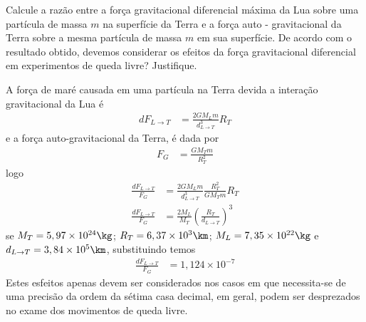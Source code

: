 \begin{prob}
	Calcule a razão entre a força gravitacional diferencial máxima da Lua sobre uma partícula
	de massa $m$ na superfície da Terra e a força auto - gravitacional da Terra sobre a mesma partícula de massa $m$ em sua superfície. De acordo com o resultado obtido, devemos considerar os efeitos da força gravitacional diferencial em experimentos de queda livre? Justifique.
	\begin{sol}
		A força de maré causada em uma partícula na Terra devida a interação gravitacional da Lua é
		\begin{align}
			dF_{L\to T}&=\frac{2GM_Lm}{d^3_{L\to T}}R_T
		\end{align}
		e a força auto-gravitacional da Terra, é dada por
		\begin{align}
			F_G&=\frac{GM_Tm}{R_T^2}
		\end{align}
		logo
		\begin{align}
			\frac{dF_{L\to T}}{F_G}&=\frac{2GM_Lm}{d^3_{L\to T}}\frac{R_T^2}{GM_Tm}R_T\\\nonumber
			\frac{dF_{L\to T}}{F_G}&=\frac{2M_L}{M_T}\left(\frac{R_T}{d_{L\to T}}\right)^3
		\end{align}
		se $M_T=5,97\times 10^{24}\kg$; $R_T=6,37\times 10^3\km$; $M_L=7,35\times 10^{22}\kg$ e $d_{L\to T}=3,84\times10^5\km$, substituindo temos
		\begin{align}
			\frac{dF_{L\to T}}{F_G}&=1,124\times 10^{-7}
		\end{align}
		Estes esfeitos apenas devem ser considerados nos casos em que necessita-se de uma precisão da ordem da sétima casa decimal, em geral, podem ser desprezados no exame dos movimentos de queda livre.
	\end{sol}
\end{prob}
